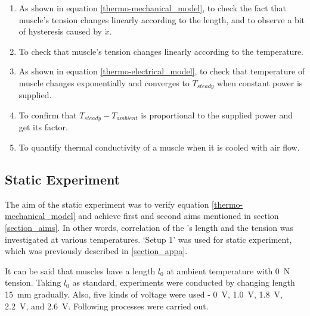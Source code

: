 \begin{enumerate} 
	\item As shown in equation \eqref{thermo-mechanical_model}, to check the fact that muscle's tension changes linearly according to the length, and to observe a bit of hysteresis caused by $\dot{x}$.
	\item To check that muscle's tension changes linearly according to the temperature.
	\item As shown in equation \eqref{thermo-electrical_model}, to check that temperature of muscle changes exponentially and converges to $T_{steady}$ when constant power is supplied.
	\item To confirm that $T_{steady}-T_{ambient}$ is proportional to the supplied power and get its factor. 
	\item To quantify thermal conductivity of a muscle when it is cooled with air flow.
\end{enumerate}




\subsection{Static Experiment} \label{subsection_static_experiment}
The aim of the static experiment was to verify equation \eqref{thermo-mechanical_model} and achieve first and second aims mentioned in section \ref{section_aims}. In other words, correlation of the \scpnospace's length and the tension was investigated at various temperatures. 
`Setup 1' was used for static experiment, which was previously described in \ref{section_appa}. %

It can be said that muscles have a length $l_{0}$ at ambient temperature with \SI{0}{\newton} tension. Taking $l_{0}$ as standard, experiments were conducted by changing length \SI{15}{\milli\meter} gradually. Also, five kinds of voltage were used - \SI{0}{\volt}, \SI{1.0}{\volt}, \SI{1.8}{\volt}, \SI{2.2}{\volt}, and \SI{2.6}{\volt}. 
Following processes were carried out.

